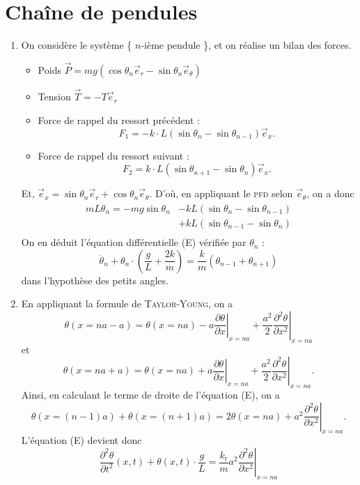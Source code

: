 \section{Chaîne de pendules}

\begin{enumerate}
	\item On considère le système \{ $n$-ième pendule \}, et on réalise un bilan des forces.
		\begin{itemize}
			\item Poids $\vec{P} = m g (\cos \theta_n \vec{e}_r - \sin \theta_n \vec{e}_\theta)$
			\item Tension $\vec{T} = - T \vec{e}_r$
			\item Force de rappel du ressort précédent : \[
					F_1 = -k \cdot L (\sin \theta_n - \sin \theta_{n-1}) \vec{e}_x
				.\]
			\item Force de rappel du ressort suivant : \[
				F_2 = k \cdot L (\sin \theta_{n+1} - \sin \theta_n) \vec{e}_x
			.\]
		\end{itemize}
		Et, $\vec{e}_x = \sin \theta_n \vec{e}_r + \cos \theta_n \vec{e}_\theta$.
		D'où, en appliquant le \textsc{pfd} selon $\vec{e}_\theta$, on a donc
		\begin{align*}
			m L \ddot{\theta}_n = -mg \sin \theta_n &- kL (\sin \theta_n - \sin \theta_{n-1})\\
			&+ kL (\sin \theta_{n-1} - \sin \theta_n) \\
		\end{align*}
		On en déduit l'équation différentielle (E) vérifiée par $\theta_n$ : \[
			\ddot{\theta}_n + \theta_n \cdot \left( \frac{g}{L} + \frac{2k}{m} \right) = \frac{k}{m}(\theta_{n-1} + \theta_{n+1})
		\] dans l'hypothèse des petits angles.
	\item En appliquant la formule de \textsc{Taylor-Young}, on a \[
			\theta(x = na - a) = \theta(x = na) - a \left.\frac{\partial \theta}{\partial x}\right|_{x = na} + \frac{a^2}{2} \left.\frac{\partial^2 \theta}{\partial x^2}\right|_{x = na}
		\] et \[
			\theta(x = na + a) = \theta(x = na) + a \left.\frac{\partial \theta}{\partial x}\right|_{x = na} + \frac{a^2}{2} \left.\frac{\partial^2 \theta}{\partial x^2}\right|_{x = na}
		.\]
		Ainsi, en calculant le terme de droite de l'équation (E), on a \[
			\theta(x = (n-1)a) + \theta(x = (n+1)a) = 2 \theta(x = na) + a^2 \left.\frac{\partial^2 \theta}{\partial x^2}\right|_{x = na}
		.\] 
		L'équation (E) devient donc \[
			\frac{\partial^2 \theta}{\partial t^2}(x,t) + \theta(x,t) \cdot \frac{g}{L} = \frac{k_\mathrm{r}}{m} a^2 \left. \frac{\partial^2 \theta}{\partial x^2}\right|_{x = na}
\]
\end{enumerate}
